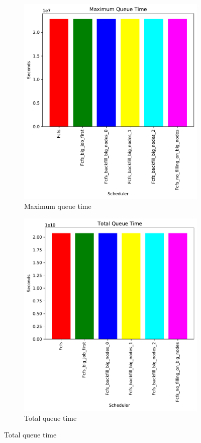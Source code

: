 \documentclass[a4paper]{article}
\begin{document}
	\begin{figure}[H]\centering
	\begin{subfigure}[b]{0.4\linewidth}\centering\includegraphics[width=1\linewidth]{MBSS/plot/Size_Constraint_2022-03-26->2022-03-26_Maximum_queue_time_95_128_4_256_1_1024.pdf}\caption{Maximum queue time}\end{subfigure}
	\begin{subfigure}[b]{0.4\linewidth}\centering\includegraphics[width=1\linewidth]{MBSS/plot/Size_Constraint_2022-03-26->2022-03-26_Total_queue_time_95_128_4_256_1_1024.pdf}\caption{Total queue time}\end{subfigure}

\end{figure}
\end{document}
